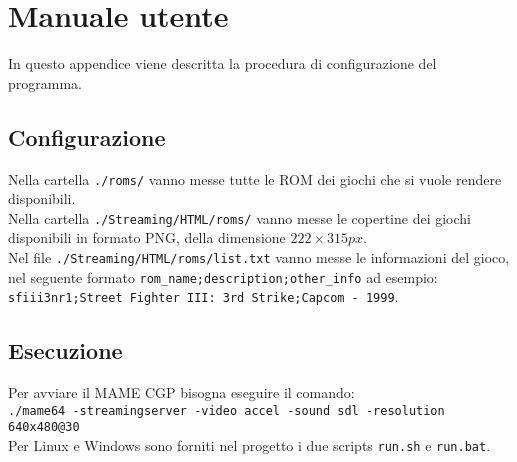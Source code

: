 \chapter{Manuale utente}
In questo appendice viene descritta la procedura di configurazione del programma.

\section{Configurazione}
Nella cartella \verb|./roms/| vanno messe tutte le ROM dei giochi che si vuole rendere disponibili.\\
Nella cartella \verb|./Streaming/HTML/roms/| vanno messe le copertine dei giochi disponibili in formato PNG, della dimensione $222 \times 315px$.\\
Nel file \verb|./Streaming/HTML/roms/list.txt| vanno messe le informazioni del gioco, nel seguente formato \verb|rom_name;description;other_info| ad esempio:\\ \verb|sfiii3nr1;Street Fighter III: 3rd Strike;Capcom - 1999|.

\section{Esecuzione} \label{sec:chapMU_Esecuzione}
Per avviare il MAME CGP bisogna eseguire il comando:\\
\verb|./mame64 -streamingserver -video accel -sound sdl -resolution 640x480@30|\\
Per Linux e Windows sono forniti nel progetto i due scripts \verb|run.sh| e \verb|run.bat|.
